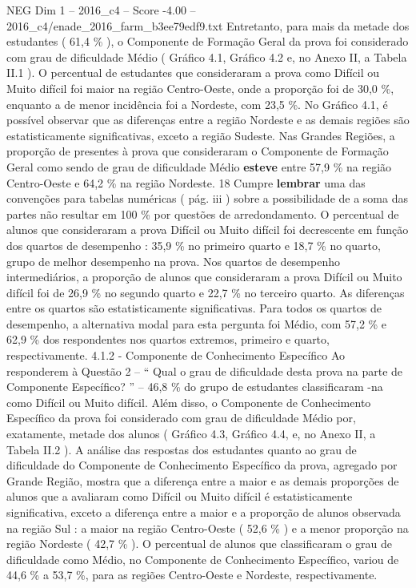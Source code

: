 \begin{textsample}{NEG Dim 1 – 2016\_c4 – Score -4.00 – 2016\_c4/enade\_2016\_farm\_b3ee79edf9.txt}
Entretanto, para mais da metade dos estudantes ( 61,4 \% ), o Componente de Formação Geral da prova foi considerado com grau de dificuldade Médio ( Gráfico 4.1, Gráfico 4.2 e, no Anexo II, a Tabela II.1 ).
O percentual de estudantes que consideraram a prova como Difícil ou Muito difícil foi maior na região Centro-Oeste, onde a proporção foi de 30,0 \%, enquanto a de menor incidência foi a Nordeste, com 23,5 \%.
No Gráfico 4.1, é possível observar que as diferenças entre a região Nordeste e as demais regiões são estatisticamente significativas, exceto a região Sudeste.
Nas Grandes Regiões, a proporção de presentes à prova que consideraram o Componente de Formação Geral como sendo de grau de dificuldade Médio \textbf{esteve} entre 57,9 \% na região Centro-Oeste e 64,2 \% na região Nordeste. 18 Cumpre \textbf{lembrar} uma das convenções para tabelas numéricas ( pág. iii ) sobre a possibilidade de a soma das partes não resultar em 100 \% por questões de arredondamento.
O percentual de alunos que consideraram a prova Difícil ou Muito difícil foi decrescente em função dos quartos de desempenho : 35,9 \% no primeiro quarto e 18,7 \% no quarto, grupo de melhor desempenho na prova.
Nos quartos de desempenho intermediários, a proporção de alunos que consideraram a prova Difícil ou Muito difícil foi de 26,9 \% no segundo quarto e 22,7 \% no terceiro quarto.
As diferenças entre os quartos são estatisticamente significativas.
Para todos os quartos de desempenho, a alternativa modal para esta pergunta foi Médio, com 57,2 \% e 62,9 \% dos respondentes nos quartos extremos, primeiro e quarto, respectivamente. 4.1.2 - Componente de Conhecimento Específico Ao responderem à Questão 2 – “ Qual o grau de dificuldade desta prova na parte de Componente Específico? ” – 46,8 \% do grupo de estudantes classificaram -na como Difícil ou Muito difícil.
Além disso, o Componente de Conhecimento Específico da prova foi considerado com grau de dificuldade Médio por, exatamente, metade dos alunos ( Gráfico 4.3, Gráfico 4.4, e, no Anexo II, a Tabela II.2 ).
A análise das respostas dos estudantes quanto ao grau de dificuldade do Componente de Conhecimento Específico da prova, agregado por Grande Região, mostra que a diferença entre a maior e as demais proporções de alunos que a avaliaram como Difícil ou Muito difícil é estatisticamente significativa, exceto a diferença entre a maior e a proporção de alunos observada na região Sul : a maior na região Centro-Oeste ( 52,6 \% ) e a menor proporção na região Nordeste ( 42,7 \% ).
O percentual de alunos que classificaram o grau de dificuldade como Médio, no Componente de Conhecimento Específico, variou de 44,6 \% a 53,7 \%, para as regiões Centro-Oeste e Nordeste, respectivamente.

\end{textsample}
